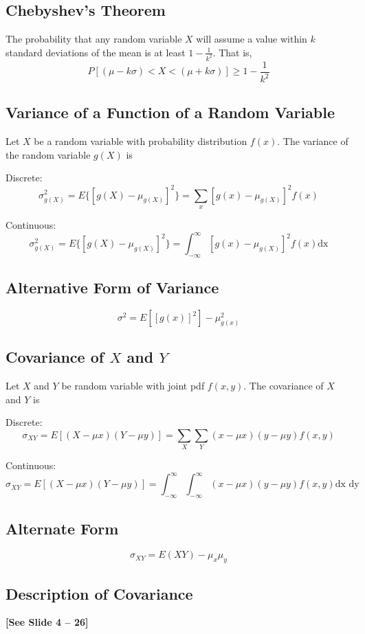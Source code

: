 \documentclass{book}
\begin{document}
\subsection{Chebyshev's Theorem}

The probability that any random variable $X$ will assume a value within $k$ standard deviations of the mean is at least $1-\frac{1}{k^2}$. That is,
$$P[(\mu - k\sigma) < X < (\mu + k\sigma)] \ge 1 - \frac{1}{k^2}$$

\subsection{Variance of a Function of a Random Variable}
Let $X$ be a random variable with probability distribution $f(x)$. The variance of the random variable $g(X)$ is

Discrete:
$$\sigma^2_{g(X)} = E\{[g(X) - \mu_{g(X)}]^2\} = \sum_x [g(x) - \mu_{g(X)}]^2 f(x)$$

Continuous:
$$\sigma^2_{g(X)} = E\{[g(X) - \mu_{g(X)}]^2\} = \int_{-\infty}^\infty [g(x) - \mu_{g(X)}]^2 f(x) \text{dx}$$

\subsection{Alternative Form of Variance}
$$\sigma^2 = E[[g(x)]^2]-\mu^2_{g(x)}$$

\subsection{Covariance of $X$ and $Y$}
Let $X$ and $Y$ be random variable with joint pdf  $f(x,y)$. The covariance of $X$ and $Y$ is

Discrete:
$$\sigma_{XY} = E[(X-\mu x)(Y-\mu y)]=\sum_X \sum_Y (x-\mu x)(y-\mu y) f(x,y)$$

Continuous:
$$\sigma_{XY} = E[(X-\mu x)(Y-\mu y)]=\int_{-\infty}^\infty \int_{-\infty}^\infty (x-\mu x)(y-\mu y) f(x,y) \text{dx dy}$$

\subsection{Alternate Form}
$$\sigma_{XY}=E(XY) - \mu_x \mu_y$$

\subsection{Description of Covariance}
\textbf{[See Slide 4 -- 26]}
\end{document}
